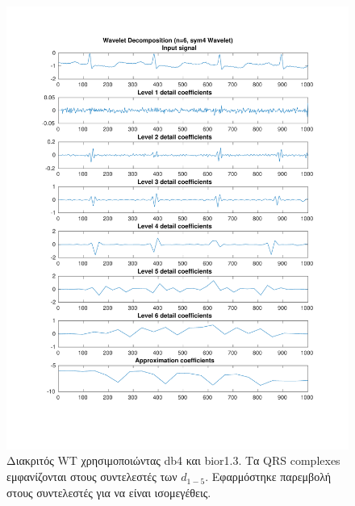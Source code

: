 \documentclass[11pt,a4paper]{article}
\begin{document}
\begin{figure}[H]
\begin{minipage}{0.48\textwidth}
	\includegraphics[width=\textwidth]{fig/112l1_dwt2.pdf}
\end{minipage}
\vfill
\caption{Διακριτός WT χρησιμοποιώντας db4 και bior1.3. Τα QRS complexes εμφανίζονται στους συντελεστές των $d_{1-5}$. Εφαρμόστηκε παρεμβολή στους συντελεστές για να είναι ισομεγέθεις.}
\label{fig:112l1_dwt}
\end{figure}
\end{document}
